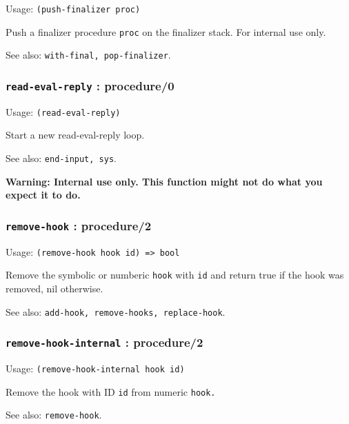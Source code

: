 \documentclass[
]{article}
\newcommand{\passthrough}[1]{#1}
\begin{document}
Usage: \passthrough{\lstinline!(push-finalizer proc)!}

Push a finalizer procedure \passthrough{\lstinline!proc!} on the
finalizer stack. For internal use only.

See also: \passthrough{\lstinline!with-final, pop-finalizer!}.

\hypertarget{read-eval-reply-procedure0}{%
\subsubsection{\texorpdfstring{\texttt{read-eval-reply} :
procedure/0}{read-eval-reply : procedure/0}}\label{read-eval-reply-procedure0}}

Usage: \passthrough{\lstinline!(read-eval-reply)!}

Start a new read-eval-reply loop.

See also: \passthrough{\lstinline!end-input, sys!}.

\textbf{Warning: Internal use only. This function might not do what you
expect it to do.}

\hypertarget{remove-hook-procedure2}{%
\subsubsection{\texorpdfstring{\texttt{remove-hook} :
procedure/2}{remove-hook : procedure/2}}\label{remove-hook-procedure2}}

Usage: \passthrough{\lstinline!(remove-hook hook id) => bool!}

Remove the symbolic or numberic \passthrough{\lstinline!hook!} with
\passthrough{\lstinline!id!} and return true if the hook was removed,
nil otherwise.

See also:
\passthrough{\lstinline!add-hook, remove-hooks, replace-hook!}.

\hypertarget{remove-hook-internal-procedure2}{%
\subsubsection{\texorpdfstring{\texttt{remove-hook-internal} :
procedure/2}{remove-hook-internal : procedure/2}}\label{remove-hook-internal-procedure2}}

Usage: \passthrough{\lstinline!(remove-hook-internal hook id)!}

Remove the hook with ID \passthrough{\lstinline!id!} from numeric
\passthrough{\lstinline!hook.!}

See also: \passthrough{\lstinline!remove-hook!}.
\end{document}
